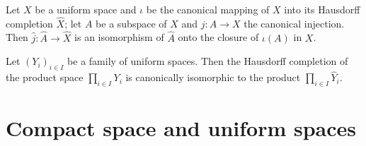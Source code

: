 \begin{corollary}\label{uniform space completion of subspace}
Let $X$ be a uniform space and $\iota$ be the canonical mapping of $X$ into its Hausdorff completion $\widehat{X}$; let $A$ be a subspace of $X$ and $j:A\to X$ the canonical injection. Then $\hat{j}:\widehat{A}\to\widehat{X}$ is an isomorphism of $\widehat{A}$ onto the closure of $\iota(A)$ in $X$.
\end{corollary}
\begin{corollary}
Let $(Y_i)_{i\in I}$ be a family of uniform spaces. Then the Hausdorff completion of the product space $\prod_{i\in I}Y_i$ is canonically isomorphic to the product $\prod_{i\in I}\widehat{Y}_i$.
\end{corollary}
\section{Compact space and uniform spaces}
